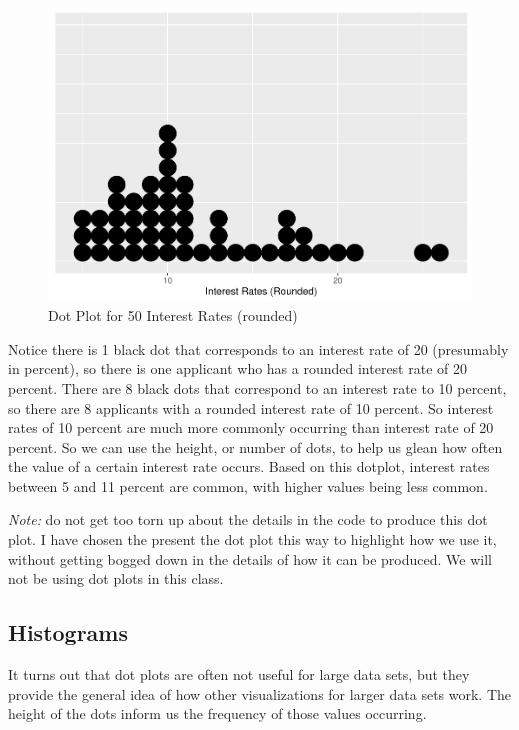 \documentclass[
]{book}
\begin{document}
\begin{figure}
\centering
\includegraphics{bookdown-demo_files/figure-latex/dotplot-1.pdf}
\caption{\label{fig:dotplot}Dot Plot for 50 Interest Rates (rounded)}
\end{figure}

Notice there is 1 black dot that corresponds to an interest rate of 20 (presumably in percent), so there is one applicant who has a rounded interest rate of 20 percent. There are 8 black dots that correspond to an interest rate to 10 percent, so there are 8 applicants with a rounded interest rate of 10 percent. So interest rates of 10 percent are much more commonly occurring than interest rate of 20 percent. So we can use the height, or number of dots, to help us glean how often the value of a certain interest rate occurs. Based on this dotplot, interest rates between 5 and 11 percent are common, with higher values being less common.

\emph{Note:} do not get too torn up about the details in the code to produce this dot plot. I have chosen the present the dot plot this way to highlight how we use it, without getting bogged down in the details of how it can be produced. We will not be using dot plots in this class.

\subsection{Histograms}\label{histograms}

It turns out that dot plots are often not useful for large data sets, but they provide the general idea of how other visualizations for larger data sets work. The height of the dots inform us the frequency of those values occurring.
\end{document}
